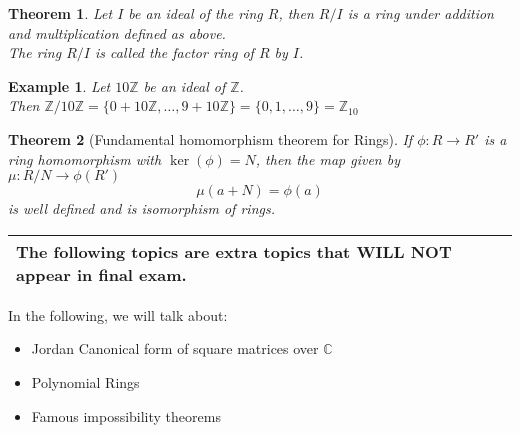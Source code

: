 \documentclass{article}
\theoremstyle{MyNonumberplain}
\theoremstyle{break}
\theoremstyle{break}
\newtheorem{theorem}{Theorem}[section]
\newtheorem{example}{Example}[section]
\theoremstyle{break}
\theoremstyle{definition}
\theoremstyle{break}
\begin{document}
\begin{thmbox}
    \begin{theorem}
        Let $I$ be an ideal of the ring $R$, then $R / I$ is a ring under addition and
        multiplication defined as above.\\
        
        The ring $R / I$ is called the factor ring of $R$ by $I$. 
    \end{theorem}

\end{thmbox}


\begin{expbox}
    \begin{example}
        Let $10\mathbb{Z}$ be an ideal of $\mathbb{Z}$.\\

        Then $\mathbb{Z}/ 10\mathbb{Z}= \{ 0 + 10\mathbb{Z}, \ldots, 9 + 10\mathbb{Z}
        \} = \{ 0, 1, \ldots, 9 \} =\mathbb{Z}_{10}$
    \end{example}
\end{expbox}

\begin{thmbox}
    \begin{theorem}[Fundamental homomorphism theorem for Rings]
        If $\phi : R \rightarrow R'$ is a ring homomorphism with $\ker (\phi) = N$,
        then the map given by $\mu : R / N \rightarrow \phi (R')$
        \[ \mu (a + N) = \phi (a) \]
        is well defined and is isomorphism of rings. 
    \end{theorem}
\end{thmbox}

\newpage

{\noindent}\begin{tabularx}{1.0\textwidth}{|@{}X@{}|}
    \hline    
         The following topics are extra topics that \textbf{WILL NOT} appear in final exam.\\
    \hline
\end{tabularx}

In the following, we will talk about:
\begin{itemize}
\item Jordan Canonical form of square matrices over $\mathbb{C}$

\item Polynomial Rings

\item Famous impossibility theorems
\end{itemize}
\end{document}
